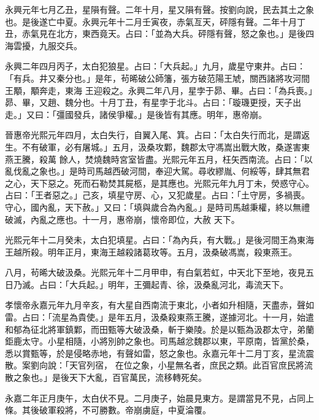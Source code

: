 \begin{pinyinscope}
 永興元年七月乙丑，星隕有聲。二年十月，星又隕有聲。按劉向說，民去其土之象也。是後遂亡中夏。永興元年十二月壬寅夜，赤氣亙天，砰隱有聲。二年十月丁丑，赤氣見在北方，東西竟天。占曰：「並為大兵。砰隱有聲，怒之象也。」是後四海雲擾，九服交兵。



 永興二年四月丙子，太白犯狼星。占曰：「大兵起。」九月，歲星守東井。占曰：「有兵。井又秦分也。」是年，茍晞破公師籓，張方破范陽王虓，關西諸將攻河間王顒，顒奔走，東海
 王迎殺之。永興二年八月，星孛于昴、畢。占曰：「為兵喪。」昴、畢，又趙、魏分也。十月丁丑，有星孛于北斗。占曰：「璇璣更授，天子出走。」又曰：「彊國發兵，諸侯爭權。」是後皆有其應。明年，惠帝崩。



 晉惠帝光熙元年四月，太白失行，自翼入尾、箕。占曰：「太白失行而北，是謂返生。不有破軍，必有屠城。」五月，汲桑攻鄴，魏郡太守馮嵩出戰大敗，桑遂害東燕王騰，殺萬
 餘人，焚燒魏時宮室皆盡。光熙元年五月，枉矢西南流。占曰：「以亂伐亂之象也。」是時司馬越西破河間，奉迎大駕。尋收繆胤、何綏等，肆其無君之心，天下惡之。死而石勒焚其屍柩，是其應也。光熙元年九月丁未，熒惑守心。占曰：「王者惡之。」己亥，填星守房、心，又犯歲星。占曰：「土守房，多禍喪。守心，國內亂，天下赦。」又曰：「填與歲合為內亂。」是時司馬越秉權，終以無禮破滅，內亂之應也。十一月，惠帝崩，懷帝即位，大赦
 天下。



 光熙元年十二月癸未，太白犯填星。占曰：「為內兵，有大戰。」是後河間王為東海王越所殺。明年正月，東海王越殺諸葛玫等。五月，汲桑破馮嵩，殺東燕王。



 八月，茍晞大破汲桑。光熙元年十二月甲申，有白氣若虹，中天北下至地，夜見五日乃滅。占曰：「大兵起。」明年，王彌起青、徐，汲桑亂河北，毒流天下。



 孝懷帝永嘉元年九月辛亥，有大星自西南流于東北，小者如升相隨，天盡赤，聲如雷。占曰：「流星為貴使。」是年五月，汲桑殺東燕王騰，遂據河北。十一月，始遣和郁為征北將軍鎮鄴，而田甄等大破汲桑，斬于樂陵。於是以甄為汲郡太守，弟蘭鉅鹿太守。小星相隨，小將別帥之象也。司馬越忿魏郡以東，平原南，皆黨於桑，悉以賞甄等，於是侵略赤地，有聲如雷，怒之象也。永嘉元年十二月丁亥，星流震散。案劉向說：「天官列宿，
 在位之象，小星無名者，庶民之類。此百官庶民將流散之象也。」是後天下大亂，百官萬民，流移轉死矣。



 永嘉二年正月庚午，太白伏不見。二月庚子，始晨見東方。是謂當見不見，占同上條。其後破軍殺將，不可勝數。帝崩虜庭，中夏淪覆。




\end{pinyinscope}
